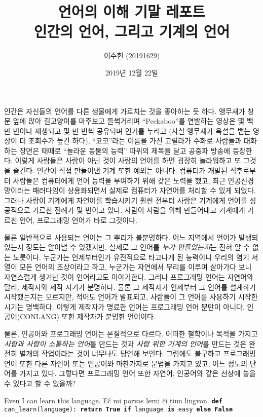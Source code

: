 \documentclass{article}
\title{
    언어의 이해 기말 레포트 \\
    \large 인간의 언어, 그리고 기계의 언어
}
\author{이주헌 (20191629)}
\date{2019년 12월 22일}
\begin{document}

\maketitle

인간은 자신들의 언어를 다른 생물에게 가르치는 것을 좋아하는 듯 하다. 앵무새가 창문 앞에 앉아 길고양이를 마주보고 들썩거리며 ``Peekaboo''를 연발하는 영상은 몇 백만 번이나 재생되고 몇 만 번씩 공유되며 인기를 누리고 (사실 앵무새가 욕설을 뱉는 영상이 더 조회수가 높긴 하다), ``코코''라는 이름을 가진 고릴라가 수화로 사람들과 대화하는 장면은 때때로 ``놀라운 동물의 능력'' 따위의 제목을 달고 공중파 방송에 등장한다. 이렇게 사람들은 사람이 아닌 것이 사람의 언어를 하면 굉장히 놀라워하고 또 그것을 즐긴다. 인간이 직접 만들어낸 기계 또한 예외는 아니다. 컴퓨터가 개발된 직후로부터 사람들은 컴퓨터에게 언어 능력을 부여하기 위해 갖은 노력을 했고, 최근 인공신경망이라는 패러다임이 상용화되면서 실제로 컴퓨터가 자연어를 처리할 수 있게 되었다. 그러나 사람이 기계에게 자연어를 학습시키기 훨씬 전부터 사람은 기계에게 언어를 성공적으로 가르친 전례가 몇 번이고 있다. 사람이 사람을 위해 만들어내고 기계에게 가르친 언어, 프로그래밍 언어가 바로 그것이다.

물론 일반적으로 사용되는 언어는 그 뿌리가 불분명하다. 어느 지역에서 언어가 발생되었는지 정도는 알아낼 수 있겠지만, 실제로 그 언어를 \emph{누가 만들었는지}는 전혀 알 수 없는 노릇이다. 누군가는 언제부터인가 유전적으로 타고나게 된 능력이니 우리의 염기 서열이 모든 언어의 조상이라고 하고, 누군가는 자연에서 무리를 이루며 살아가다 보니 자연스럽게 생겨난 것이 언어라고도 이야기한다. 그러나 프로그래밍 언어는 자연어와 달리, 제작자와 제작 시기가 분명하다. 물론 그 제작자가 언제부터 그 언어를 설계하기 시작했는지는 모르지만, 적어도 언어가 발표되고, 사람들이 그 언어를 사용하기 시작한 시기는 명백하다. 이렇게 제작자가 명료한 언어는 프로그래밍 언어 뿐만이 아니다. 인공어(CONLANG) 또한 제작자가 분명한 언어이다.

물론, 인공어와 프로그래밍 언어는 본질적으로 다르다. 어떠한 철학이나 목적을 가지고 \emph{사람과 사람이 소통하는 언어}를 만드는 것과 \emph{사람 위한 기계의 언어}를 만드는 것은 완전히 별개의 작업이라는 것이 너무나도 당연해 보인다. 그럼에도 불구하고 프로그래밍 언어 또한 다른 자연어 또는 인공어와 마찬가지로 문법을 가지고 있고, 어느 정도의 단어를 가지고 있다. 그렇다면 프로그래밍 언어 또한 자연어, 인공어와 같은 선상에 놓을 수 있다고 할 수 있을까?

\begin{exe}
    \ex Even I can learn this language.
    \ex E\^c mi porvas lerni \^ci tiun lingvon.
    \ex \texttt{\textbf{def} can\_learn(language): \textbf{return True if} language \textbf{is} easy \textbf{else False}}
\end{exe}
\end{document}
